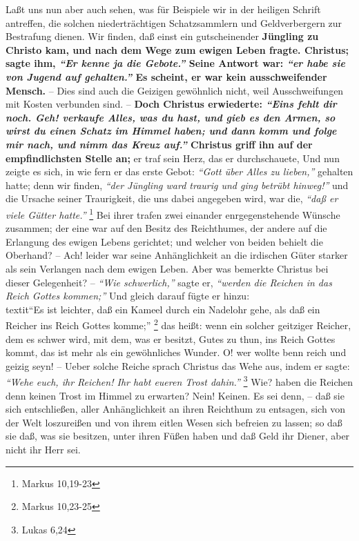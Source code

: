 Laßt uns nun aber auch sehen, was für Beispiele wir in der heiligen Schrift
antreffen, die solchen niederträchtigen
Schatzsammlern und Geldverbergern zur
Bestrafung dienen. Wir finden, daß einst ein gutscheinender
\textbf{Jüngling zu Christo
kam, und nach dem Wege zum ewigen Leben fragte. Christus; sagte ihm,
\textit{"`Er kenne ja die Gebote."'} Seine Antwort war:
\textit{"`er habe sie von Jugend auf gehalten."'} Es
scheint, er war kein ausschweifender Mensch.} -- Dies sind auch die Geizigen
gewöhnlich nicht, weil Ausschweifungen mit Kosten verbunden
sind. -- \textbf{Doch
Christus erwiederte:
\textit{"`Eins fehlt dir noch. Geh! verkaufe Alles, was du hast,
und gieb es den Armen, so wirst du einen Schatz im Himmel haben; und dann komm
und folge mir nach, und nimm das Kreuz auf."'} Christus griff ihn auf der
empfindlichsten Stelle an;} er traf sein Herz, das er durchschauete, Und nun
zeigte es sich, in wie fern er das erste Gebot: \textit{"`Gott über Alles zu
lieben,"'}
gehalten hatte; denn wir finden, \textit{"`der Jüngling ward traurig und ging
betrübt
hinweg!"'} und die Ursache seiner Traurigkeit, die uns dabei angegeben wird, war
die,
\textit{"`daß er viele Gütter hatte."'}
\footnote{Markus 10,19-23}
Bei ihrer trafen
zwei einander enrgegenstehende Wünsche zusammen; der eine war auf den Besitz des
Reichthumes, der andere auf die Erlangung des ewigen Lebens
gerichtet; und
welcher von beiden behielt die Oberhand? -- Ach! leider war seine Anhänglichkeit
an die irdischen Güter starker als sein Verlangen nach dem ewigen Leben. Aber
was bemerkte Christus bei dieser Gelegenheit? -- \textit{"`Wie schwerlich,"'}
sagte er,
\textit{"`werden die Reichen in das Reich Gottes kommen;"'} Und gleich darauf
fügte er
hinzu:\\textit{"`Es ist leichter, daß ein Kameel durch ein Nadelohr gehe, als
daß ein
Reicher ins Reich Gottes komme;"'}
\footnote{Markus 10,23-25}
das heißt: wenn ein
solcher geitziger Reicher, dem es schwer wird, mit dem, was er besitzt, Gutes zu
thun, ins Reich Gottes kommt, das ist mehr als ein
gewöhnliches Wunder. O! wer
wollte benn reich und geizig seyn! -- Ueber solche Reiche sprach Christus das
Wehe aus, indem er sagte: \textit{"`Wehe euch, ihr Reichen! Ihr habt eueren
Trost
dahin."'}
\footnote{Lukas 6,24}
Wie? haben die Reichen denn keinen Trost im
Himmel zu erwarten? Nein! Keinen. Es sei denn, -- daß sie sich
entschließen,
aller Anhänglichkeit an ihren Reichthum zu entsagen, sich von der Welt
loszureißen und von ihrem eitlen Wesen sich befreien zu lassen; so daß sie daß,
was sie besitzen, unter ihren Füßen haben und daß Geld ihr Diener, aber nicht
ihr Herr sei.

